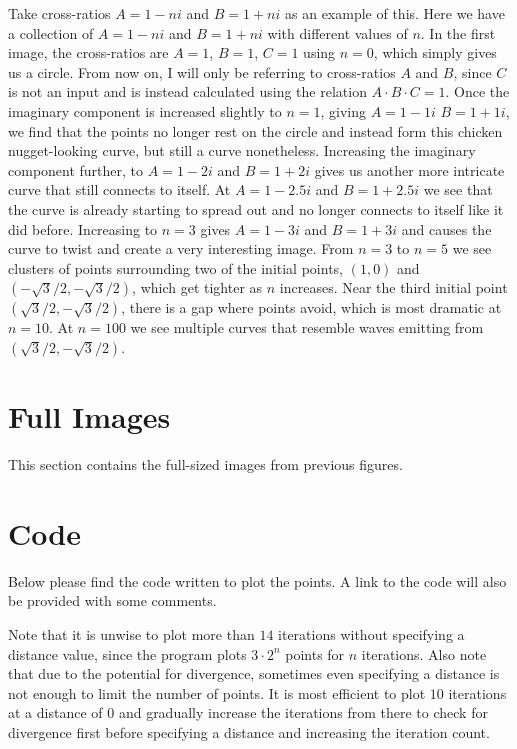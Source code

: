 \documentclass[12pt,a4paper,reqno,parskip=full]{amsart}
\numberwithin{equation}{section}
\theoremstyle{plain}
\theoremstyle{definition}
\begin{document}
Take cross-ratios $A=1-ni$ and $B=1+ni$ as an example of this. Here we have a collection of $A=1-ni$ and $B=1+ni$ with different values of $n$. In the first image, the cross-ratios are $A=1$, $B=1$, $C=1$ using $n=0$, which simply gives us a circle. From now on, I will only be referring to cross-ratios $A$ and $B$, since $C$ is not an input and is instead calculated using the relation $A\cdot B\cdot C=1$. Once the imaginary component is increased slightly to $n=1$, giving $A=1-1i$ $B=1+1i$, we find that the points no longer rest on the circle and instead form this chicken nugget-looking curve, but still a curve nonetheless. Increasing the imaginary component further, to $A=1-2i$ and $B=1+2i$ gives us another more intricate curve that still connects to itself. At $A=1-2.5i$ and $B=1+2.5i$ we see that the curve is already starting to spread out and no longer connects to itself like it did before. Increasing to $n=3$ gives $A=1-3i$ and $B=1+3i$ and causes the curve to twist and create a very interesting image. From $n=3$ to $n=5$ we see clusters of points surrounding two of the initial points, $(1,0)$ and $(-\sqrt3/2,-\sqrt3/2)$, which get tighter as $n$ increases. Near the third initial point $(\sqrt3/2,-\sqrt3/2)$, there is a gap where points avoid, which is most dramatic at $n=10$. At $n=100$ we see multiple curves that resemble waves emitting from $(\sqrt3/2,-\sqrt3/2)$.


\newpage
\appendix
\appendixpage
\addappheadtotoc

\section{Full Images}

This section contains the full-sized images from previous figures.

\section{Code}
Below please find the code written to plot the points. A link to the code will also be provided with some comments.

Note that it is unwise to plot more than $14$ iterations without specifying a distance value, since the program plots $3\cdot2^n$ points for $n$ iterations. Also note that due to the potential for divergence, sometimes even specifying a distance is not enough to limit the number of points. It is most efficient to plot $10$ iterations at a distance of $0$ and gradually increase the iterations from there to check for divergence first before specifying a distance and increasing the iteration count. 



\newpage

\end{document}
